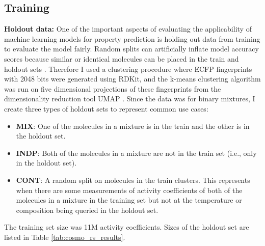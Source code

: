 
\subsection{Training}
\noindent
\textbf{Holdout data:} One of the important aspects of evaluating the applicability of machine learning models for property prediction is holding out data from training to evaluate the model fairly. Random splits can artificially inflate model accuracy scores because similar or identical molecules can be placed in the train and holdout sets \cite{Kovacs2021}. Therefore I used a clustering procedure where  ECFP fingerprints with 2048 bits were generated using RDKit, and the k-means clustering algorithm \cite{MacQueen1967} was run on five dimensional projections of these fingerprints from the dimensionality reduction tool UMAP \cite{McInnes2018}. Since the data was for binary mixtures, I create three types of holdout sets to represent common use cases:

\begin{itemize}
    \item \textbf{MIX}: One of the molecules in a mixture is in the train and the other is in the holdout set.
    \item \textbf{INDP}: Both of the molecules in a mixture are not in the train set (i.e., only in the holdout set).
    \item \textbf{CONT}: A random split on molecules in the train clusters. This represents when there are some measurements of activity coefficients of both of the molecules in a mixture in the training set but not at the temperature or composition being queried in the holdout set. 
\end{itemize}

The training set size was 11M activity coefficients. Sizes of the holdout set are listed in Table \ref{tab:cosmo_rs_results}.

